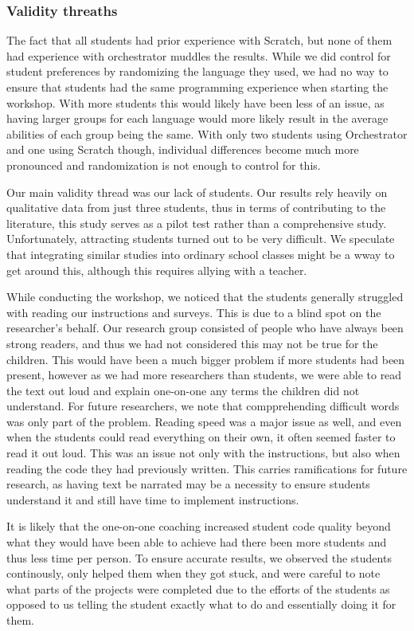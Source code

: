 \subsubsection{Validity threaths}
The fact that all students had prior experience with Scratch, but none of them had experience with orchestrator muddles the results. While we did control for student preferences by randomizing the language they used, we had no way to ensure that students had the same programming experience when starting the workshop. With more students this would likely have been less of an issue, as having larger groups for each language would more likely result in the average abilities of each group being the same. With only two students using Orchestrator and one using Scratch though, individual differences become much more pronounced and randomization is not enough to control for this.

Our main validity thread was our lack of students. Our results rely heavily on qualitative data from just three students, thus in terms of contributing to the literature, this study serves as a pilot test rather than a comprehensive study. Unfortunately, attracting students turned out to be very difficult. We speculate that integrating similar studies into ordinary school classes might be a wway to get around this, although this requires allying with a teacher.

While conducting the workshop, we noticed that the students generally struggled with reading our instructions and surveys. This is due to a blind spot on the researcher's behalf. Our research group consisted of people who have always been strong readers, and thus we had not considered this may not be true for the children. This would have been a much bigger problem if more students had been present, however as we had more researchers than students, we were able to read the text out loud and explain one-on-one any terms the children did not understand. For future researchers, we note that compprehending difficult words was only part of the problem. Reading speed was a major issue as well, and even when the students could read everything on their own, it often seemed faster to read it out loud. This was an issue not only with the instructions, but also when reading the code they had previously written. This carries ramifications for future research, as having text be narrated may be a necessity to ensure students understand it and still have time to implement instructions.

It is likely that the one-on-one coaching increased student code quality beyond what they would have been able to achieve had there been more students and thus less time per person. To ensure accurate results, we observed the students continously, only helped them when they got stuck, and were careful to note what parts of the projects were completed due to the efforts of the students as opposed to us telling the student exactly what to do and essentially doing it for them.

